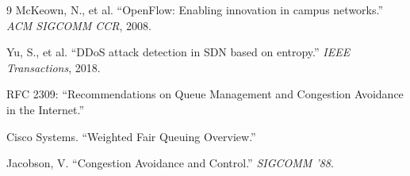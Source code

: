 \documentclass[12pt]{report}
\begin{document}
\begin{thebibliography}{9}
McKeown, N., et al. ``OpenFlow: Enabling innovation in campus networks.'' \textit{ACM SIGCOMM CCR}, 2008.

Yu, S., et al. ``DDoS attack detection in SDN based on entropy.'' \textit{IEEE Transactions}, 2018.

RFC 2309: ``Recommendations on Queue Management and Congestion Avoidance in the Internet.''

Cisco Systems. ``Weighted Fair Queuing Overview.''

Jacobson, V. ``Congestion Avoidance and Control.'' \textit{SIGCOMM '88}.
\end{thebibliography}
\end{document}
